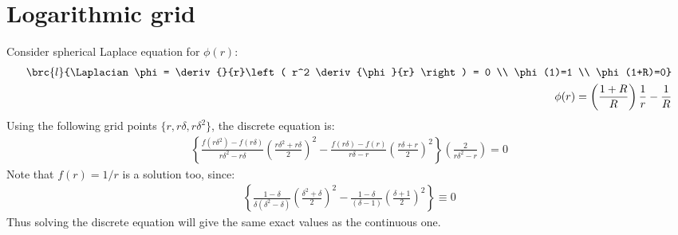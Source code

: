 \section{Logarithmic grid}
Consider spherical Laplace equation for $\phi(r)$:
\begin{eqnarray}
 \brc{l}{\Laplacian \phi = \deriv{}{r}\left( r^2 \deriv{\phi}{r} \right) = 0 \\ \phi(1)=1 \\ \phi(1+R)=0} \\
 \phi(r) = \left(\frac{1+R}{R}\right)\frac{1}{r} -\frac{1}{R}
\end{eqnarray}
Using the following grid points $\{r, r\delta, r\delta^2\}$, the discrete equation is:
\begin{eqnarray}
\left\{
\frac{f(r\delta^2) - f(r\delta)}{r\delta^2 - r\delta}
\left(\frac{r\delta^2 + r\delta}{2}\right)^2
-
\frac{f(r\delta) - f(r)}{r\delta - r}
\left(\frac{r\delta + r}{2}\right)^2
\right\}
\left(\frac{2}{r\delta^2 - r}\right) = 0
\end{eqnarray}
Note that $f(r) = 1/r$ is a solution too, since:
\begin{eqnarray}
\left\{
\frac{1 - \delta}{\delta (\delta^2 - \delta)}
\left(\frac{\delta^2 + \delta}{2}\right)^2
-
\frac{1 - \delta}{(\delta - 1)}
\left(\frac{\delta + 1}{2}\right)^2
\right\} \equiv 0
\end{eqnarray}
Thus solving the discrete equation will give the same exact values as the continuous one.

